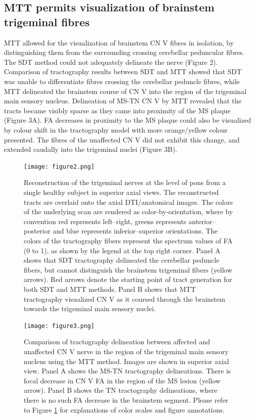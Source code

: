 \subsection{MTT permits visualization of brainstem trigeminal fibres}
MTT allowed for the visualization of brainstem CN V fibres in isolation, by distinguishing them from the surrounding crossing cerebellar peduncular fibres. The SDT method could not adequately delineate the nerve (Figure 2). Comparison of tractography results between SDT and MTT showed that SDT was unable to differentiate fibres crossing the cerebellar peduncle fibres, while MTT delineated the brainstem course of CN V into the region of the trigeminal main sensory nucleus. Delineation of MS-TN CN V by MTT revealed that the tracts became visibly sparse as they came into proximity of the MS plaque (Figure 3A). FA decreases in proximity to the MS plaque could also be visualized by colour shift in the tractography model with more orange/yellow colour presented. The fibres of the unaffected CN V did not exhibit this change, and extended caudally into the trigeminal nuclei (Figure 3B). 

\begin{figure}[p]
\texttt{[image: figure2.png]}
\caption[Reconstruction of the trigeminal nerves at the level of pons from a single healthy subject in superior axial views.]{Reconstruction of the trigeminal nerves at the level of pons from a single healthy subject in superior axial views. The reconstructed tracts are overlaid onto the axial DTI/anatomical images. The colors of the underlying scan are rendered as color-by-orientation, where by convention red represents left–right, greens represents anterior–posterior and blue represents inferior–superior orientations. The colors of the tractography fibers represent the spectrum values of FA (0 to 1), as shown by the legend at the top right corner. Panel A shows that SDT tractography delineated the cerebellar peduncle fibers, but cannot distinguish the brainstem trigeminal fibers (yellow arrows). Red arrows denote the starting point of tract generation for both SDT and MTT methods. Panel B shows that MTT tractography visualized CN V as it coursed through the brainstem towards the trigeminal main sensory nuclei.}
\centering
\label{fig:MSfigure2}
\end{figure}

\begin{figure}[p]
\texttt{[image: figure3.png]}
\caption[Comparison of tractography delineation between affected and unaffected CN V nerve in the region of the trigeminal main sensory nucleus using the MTT method.]{Comparison of tractography delineation between affected and unaffected CN V nerve in the region of the trigeminal main sensory nucleus using the MTT method. Images are shown in superior axial view. Panel A shows the MS-TN tractography delineations. There is focal decrease in CN V FA in the region of the MS lesion (yellow arrow). Panel B shows the TN tractography delineations, where there is no such FA decrease in the brainstem segment. Please refer to Figure \protect\ref{fig:MSfigure2} for explanations of color scales and figure annotations.}
\centering
\label{fig:MSfigure3}
\end{figure}


